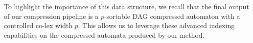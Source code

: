 To highlight the importance of this data structure, we recall that the final output of our compression pipeline is a $p$-sortable DAG compressed automaton with a controlled co-lex width $p$. This allows us to leverage these advanced indexing capabilities on the compressed automata produced by our method.